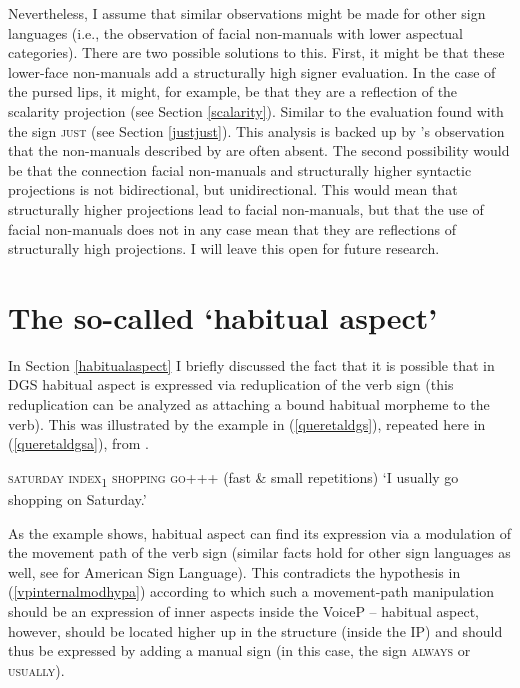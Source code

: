 Nevertheless, I assume that similar observations might be made for other sign languages (i.e., the observation of facial non-manuals with lower aspectual categories). There are two possible solutions to this. First, it might be that these lower-face non-manuals add a structurally high signer evaluation. In the case of the pursed lips, it might, for example, be that they are a reflection of the scalarity projection (see Section \ref{scalarity}). Similar to the evaluation found with the sign \textsc{just} (see Section \ref{justjust}). This analysis is backed up by \citeauthor{boven2018throughaspect}'s observation that the non-manuals described by \citet{hoitingslobin2001typological} are often absent. The second possibility would be that the connection facial non-manuals and structurally higher syntactic projections is not bidirectional, but unidirectional. This would mean that structurally higher projections lead to facial non-manuals, but that the use of facial non-manuals does not in any case mean that they are reflections of structurally high projections. I will leave this open for future research.


\section{The so-called `habitual aspect'}\label{habitualtwo}
In Section \ref{habitualaspect} I briefly discussed the fact that it is possible that in DGS habitual aspect is expressed via reduplication of the verb sign (this reduplication can be analyzed as attaching a bound habitual morpheme to the verb). This was illustrated by the example in (\ref{queretaldgs}), repeated here in (\ref{queretaldgsa}), from \citet[225]{signgram2017}.

\begin{exe}
\ex \textsc{saturday index\textsubscript{1} shopping go+++} (fast \& small repetitions) 
\glt `I usually go shopping on Saturday.'\label{queretaldgsa}
\end{exe}

\noindent As the example shows, habitual aspect can find its expression via a modulation of the movement path of the verb sign (similar facts hold for other sign languages as well, see \citealt{wilbur2009productive} for American Sign Language). This contradicts the hypothesis in (\ref{vpinternalmodhypa}) according to which such a movement-path manipulation should be an expression of inner aspects inside the VoiceP -- habitual aspect, however, should be located higher up in the structure (inside the IP) and should thus be expressed by adding a manual sign (in this case, the sign \textsc{always} or \textsc{usually}). 

